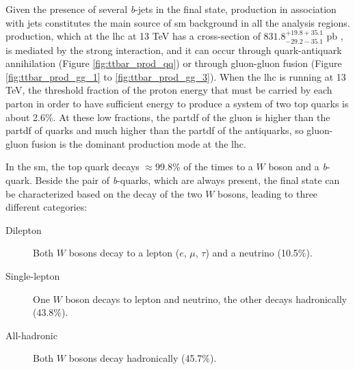 Given the presence of several \textit{b}-jets in the final state, \ttbar production in association with jets constitutes the main source of \gls{sm} background in all the analysis regions. \ttbar production, which at the \gls{lhc} at 13 TeV has a cross-section of $831.8^{+19.8 + 35.1}_{-29.2-35.1}$ pb \cite{Czakon:2013goa}, is mediated by the strong interaction, and it can occur through quark-antiquark annihilation (Figure \ref{fig:ttbar_prod_qq}) or through gluon-gluon fusion (Figure \ref{fig:ttbar_prod_gg_1} to \ref{fig:ttbar_prod_gg_3}). When the \gls{lhc} is running at 13 TeV, the threshold fraction of the proton energy that must be carried by each parton in order to have sufficient energy to produce a system of two top quarks 
is about 2.6\%.
At these low fractions, the \gls{partdf} of the gluon is higher than the \gls{partdf} of quarks and much higher than the \gls{partdf} of the antiquarks, so gluon-gluon fusion is the dominant \ttbar production mode at the \gls{lhc}.


In the \gls{sm}, the top quark decays $\approx 99.8$\% of the times to a $W$ boson and a \textit{b}-quark. 
Beside the pair of \textit{b}-quarks, which are always present, the final state can be characterized based on the decay of the two $W$ bosons, leading to three different categories:
\begin{description}
\item[Dilepton]  Both $W$ bosons decay to a lepton ($e$, $\mu$, $\tau$) and a neutrino (10.5\%).
\item[Single-lepton] One $W$ boson decays to lepton and neutrino, the other decays hadronically (43.8\%).
\item[All-hadronic] Both $W$ bosons decay hadronically (45.7\%).
\end{description}

